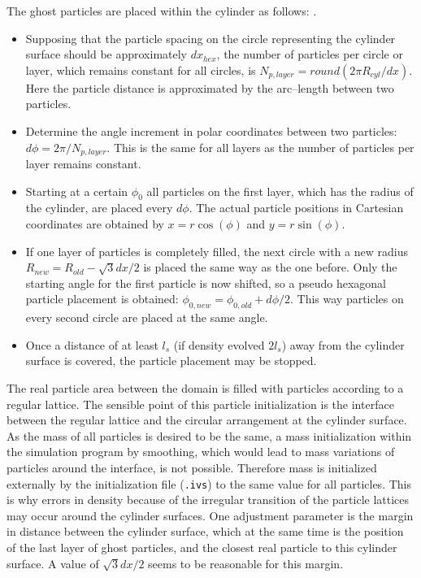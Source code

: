 \documentclass{report}
\begin{document}
\begin{itemize}
 The ghost particles are placed within the cylinder as follows:  .
  \begin{itemize}

   \item Supposing that the particle spacing on the circle representing the cylinder surface should be approximately $dx_\mathit{hex}$, the number of particles per circle or layer, which remains constant for all circles, is $N_{p,\mathit{layer}}={\mathit round}(2\pi R_\mathit{cyl}/dx)$. Here the particle distance is approximated by the arc--length between two particles.

\item Determine the angle increment in polar coordinates between two particles:
  $d\phi=2\pi/N_{p,\mathit{layer}}$. This is the same for all layers as the number of particles per layer remains constant. 
 \item Starting at a certain $\phi_0$ all particles on the first layer, which has the radius of the cylinder, are placed every $d\phi$. The actual particle positions in Cartesian coordinates are obtained by $x=r \cos(\phi)$ and $y=r \sin(\phi)$.

\item If one layer of particles is completely filled, the next circle with a new radius $R_\mathit{new}=R_\mathit{old}-\sqrt{3}dx/2$ is placed the same way as the one before. Only the starting angle for the first particle is now shifted, so a pseudo hexagonal particle placement is obtained: $\phi_{0,\mathit{new}}=\phi_{0,\mathit{old}}+d\phi/2$. This way particles on every second circle are placed at the same angle.

\item Once a distance of at least $l_s$ (if density evolved $2l_s$) away from the cylinder surface is covered, the particle placement may be stopped.
  \end{itemize}
The real particle area between the domain is filled with particles according to a regular lattice. 
The sensible point of this particle initialization is the interface between the regular lattice and the circular arrangement at the cylinder surface.
As the mass of all particles is desired to be the same, a mass initialization within the simulation program by smoothing, which would lead to mass variations of particles around the interface, is not possible. Therefore mass is initialized externally by the initialization file ({\tt .ivs}) to the same value for all particles. This is why errors in density because of the irregular transition of the particle lattices may occur around the cylinder surfaces.
One adjustment parameter is the margin in distance between the cylinder surface, which at the same time is the position of the last layer of ghost particles, and the closest real particle to this cylinder surface. A value of $\sqrt{3}dx/2$  seems to be reasonable for this margin.



\end{itemize}
\end{document}
